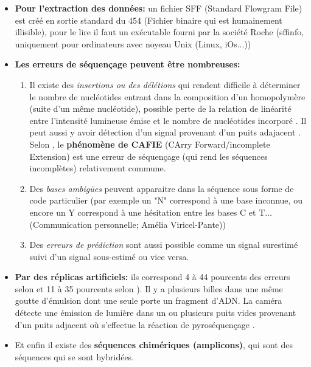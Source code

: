 \documentclass[a4paper]{article}
\begin{document}
\begin{itemize}
\item \textbf{Pour l'extraction des données:} un fichier SFF (Standard Flowgram File) est créé en sortie standard du 454 (Fichier binaire qui est humainement illisible\cite{Peyretaillade:2010}), pour le lire il faut un exécutable fourni par la société Roche (sffinfo, uniquement pour ordinateurs avec noyeau Unix (Linux, iOs...))
\item \textbf{Les erreurs de séquençage peuvent être nombreuses:} 

\begin{enumerate}
	\item Il existe des {\itshape insertions ou des délétions} qui rendent difficile à déterminer le nombre de nucléotides entrant dans la composition d'un homopolymère (suite d'un même nucléotide), possible perte de la relation de linéarité entre l'intensité lumineuse émise et le nombre de nucléotides incorporé \cite{Peyretaillade:2010}. Il peut aussi y avoir détection d'un signal provenant d'un puits adajacent \cite{Peyretaillade:2010}. Selon \cite{balzer2011systematic}, le \textbf{phénomène de CAFIE} (CArry Forward/incomplete Extension) est une erreur de séquençage (qui rend les séquences incomplètes) relativement commune.
	\item Des {\itshape bases ambigües} peuvent apparaitre dans la séquence sous forme de code particulier (par exemple un "N" correspond à une base inconnue, ou encore un Y correspond à une hésitation entre les bases C et T...(Communication personnelle; Amélia Viricel-Pante)) 
	\item Des {\itshape erreurs de prédiction} sont aussi possible comme un signal surestimé suivi d'un signal sous-estimé ou vice versa. \cite{gilles2011accuracy}
	\end{enumerate}

\item \textbf{Par des réplicas artificiels:} ils correspond 4 à 44 pourcents des erreurs selon \cite{niu2010artificial} et 11 à 35 pourcents selon \cite{gomez2009systematic}). Il y a plusieurs billes dans une même goutte d’émulsion dont une seule porte un fragment d’ADN. La caméra détecte une émission de lumière dans un ou plusieurs puits vides provenant d’un puits adjacent où s’effectue la réaction de pyroséquençage \cite{Peyretaillade:2010}.
\item Et enfin il existe des \textbf{séquences chimériques (amplicons)}, qui sont des séquences qui se sont hybridées\cite{haas2011chimeric}.
\end{itemize}
\end{document}
